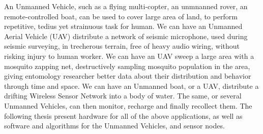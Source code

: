 

An Unmanned Vehicle, such as a flying multi-copter, an unmnanned rover, an remote-controlled boat, can be used to cover large area of land, to perform repetitive, tedius yet strainuous task for human.
We can have an Unmanned Aerial Vehicle (UAV) distribute a network of seismic microphone, used during seismic surveying, in trecherous terrain, free of heavy audio wiring, without risking injury to human worker.
We can have an UAV sweep a large area with a mosquito zapping net, destructively sampling mosquito population in the area, giving entomology researcher better data about their distribution and behavior through time and space.
We can have an Unmanned boat, or a UAV, distribute a drifting Wireless Sensor Network into a body of water.
The same, or several Unmanned Vehicles, can then monitor, recharge and finally recollect them.
The following thesis present hardware for all of the above applications, as well as software and algorithms for the Unmanned Vehicles, and sensor nodes.
